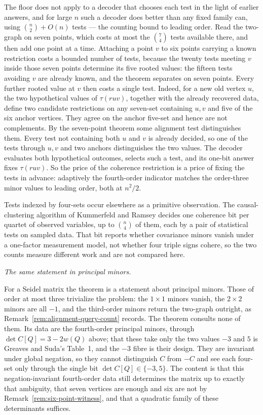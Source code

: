 \begin{remark}
The floor does not apply to a decoder that chooses each test in the light of
earlier answers, and for large \(n\) such a decoder does better than any
fixed family can, using \(\binom n2+O(n)\) tests --- the counting bound to
leading order.  Read the two-graph on seven points, which costs at most the
\(\binom74\) tests available there, and then add one point at a time.
Attaching a point \(v\) to six points carrying a known restriction costs a
bounded number of tests, because the twenty tests meeting \(v\) inside those
seven points determine its five rooted values: the fifteen tests avoiding
\(v\) are already known, and the theorem separates on seven points.  Every
further rooted value at \(v\) then costs a single test.  Indeed, for a new
old vertex \(u\), the two hypothetical values of \(\tau(ruv)\), together
with the already recovered data, define two candidate restrictions on any
seven-set containing \(u,v\) and five of the six anchor vertices.  They agree
on the anchor five-set and hence are not complements.  By the seven-point
theorem some alignment test distinguishes them.  Every test not containing
both \(u\) and \(v\) is already decided, so one of the tests through
\(u,v\) and two anchors distinguishes the two values.  The decoder evaluates
both hypothetical outcomes, selects such a test, and its one-bit answer fixes
\(\tau(ruv)\).  So the price of the coherence restriction is a
price of fixing the tests in advance: adaptively the fourth-order indicator
matches the order-three minor values to leading order, both at \(n^2/2\).

Tests indexed by four-sets occur elsewhere as a primitive observation.  The
causal-clustering algorithm of Kummerfeld and Ramsey \cite{KummerfeldRamsey}
decides one coherence bit per quartet of observed variables, up to
\(\binom n4\) of them, each by a pair of statistical tests on sampled data.
That bit reports whether covariance minors vanish under a one-factor
measurement model, not whether four triple signs cohere, so the two counts
measure different work and are not compared here.
\end{remark}

\smallskip
\noindent\emph{The same statement in principal minors.}\par
For a Seidel matrix the theorem is a statement about principal minors.  Those
of order at most three trivialize the problem: the \(1\times1\) minors vanish, the \(2\times2\) minors are all
\(-1\), and the third-order minors return the two-graph outright, as
Remark~\ref{rem:alignment-query-count} records.  The theorem consults none of
them.  Its data are the fourth-order principal minors, through
\(\det C[Q]=3-2w(Q)\) above; that these take only the two values \(-3\) and
\(5\) is Greaves and Suda's Table~1, and the \(-3\) fibre is their design.
They are invariant under global negation, so they cannot distinguish \(C\)
from \(-C\) and see each four-set only through the single bit
\(\det C[Q]\in\{-3,5\}\).  The content is that this negation-invariant
fourth-order data still determines the matrix up to exactly that ambiguity,
that seven vertices are enough and six are not by
Remark~\ref{rem:six-point-witness}, and that a quadratic family of these
determinants suffices.


